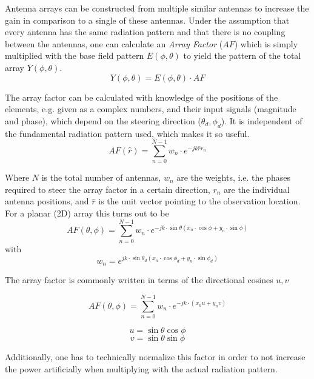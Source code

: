 Antenna arrays can be constructed from multiple similar antennas to increase the gain in comparison to a single of these antennas. \cite{hysell_radar} Under the assumption that every antenna has the same radiation pattern and that there is no coupling between the antennas, one can calculate an \textit{Array Factor} ($AF$) which is simply multiplied with the base field pattern $E(\phi, \theta)$ to yield the pattern of the total array $Y(\phi, \theta)$.
\[Y(\phi, \theta) = E(\phi, \theta) \cdot AF\]

The array factor can be calculated with knowledge of the positions of the elements, e.g. given as a complex numbers, and their input signals (magnitude and phase), which depend on the steering direction ($\theta_{d}, \phi_{d}$). It is independent of the fundamental radiation pattern used, which makes it so useful.
\[AF(\hat{r}) = \sum_{n=0}^{N-1}{w_{n}\cdot e^{-jk\hat{r}r_{n}}}\]

Where $N$ is the total number of antennas, $w_{n}$ are the weights, i.e. the phases required to steer the array factor in a certain direction, $r_{n}$ are the individual antenna positions, and $\hat{r}$ is the unit vector pointing to the observation location. For a planar (2D) array this turns out to be
\[AF(\theta,\phi) = \sum_{n=0}^{N-1}{w_{n}\cdot e^{-jk\cdot\sin{\theta}(x_{n}\cdot\cos{\phi}+y_{n}\cdot\sin{\phi})}}\]
with
\[w_{n} = e^{jk\cdot\sin{\theta_{d}}(x_{n}\cdot\cos{\phi_{d}} + y_{n} \cdot \sin{\phi_{d}})}\]

The array factor is commonly written in terms of the directional cosines $u, v$

\[AF(\theta,\phi) = \sum_{n=0}^{N-1}{w_{n}\cdot e^{-jk\cdot(x_{n}u+y_{n}v)}}\]

\[u = \sin{\theta}\cos{\phi}\]
\[v = \sin{\theta}\sin{\phi}\]

Additionally, one has to technically normalize this factor in order to not increase the power artificially when multiplying with the actual radiation pattern.



